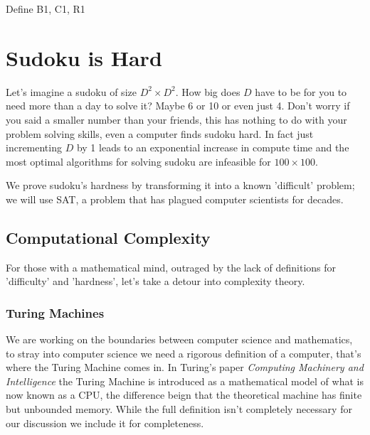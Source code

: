 \documentclass[a4paper,11pt]{report}
\begin{document}
Define B1, C1, R1



\chapter{Sudoku is Hard}

Let's imagine a sudoku of size $D^2\times D^2$. How big does $D$ have to be for you to need more than a day to solve it? Maybe 6 or 10 or even just 4. Don't worry if you said a smaller number than your friends, this has nothing to do with your problem solving skills, even a computer finds sudoku hard. In fact just incrementing $D$ by 1 leads to an exponential increase in compute time and the most optimal algorithms for solving sudoku are infeasible for $100 \times 100$.

We prove sudoku's hardness by transforming it into a known 'difficult' problem; we will use SAT, a problem that has plagued computer scientists for decades.

\section{Computational Complexity}

For those with a mathematical mind, outraged by the lack of definitions for 'difficulty' and 'hardness', let's take a detour into complexity theory.

\subsection{Turing Machines}

We are working on the boundaries between computer science and mathematics, to stray into computer science we need a rigorous definition of a computer, that's where the Turing Machine comes in. In Turing's paper \textit{Computing Machinery and Intelligence} \cite{turing} the Turing Machine is introduced as a mathematical model of what is now known as a CPU, the difference beign that the theoretical machine has finite but unbounded memory. While the full definition isn't completely necessary for our discussion we include it for completeness.
\end{document}
